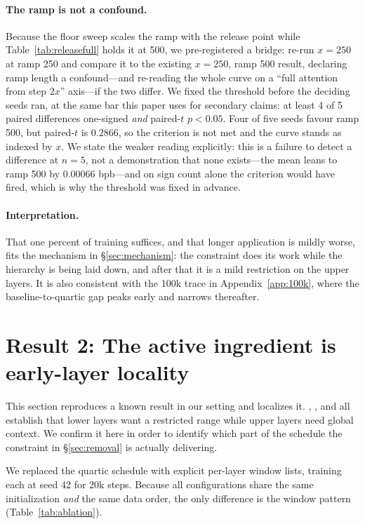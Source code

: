 \documentclass[11pt,a4paper]{article}
\begin{document}
\paragraph{The ramp is not a confound.} Because the floor sweep scales the ramp with the release point while Table~\ref{tab:releasefull} holds it at 500, we pre-registered a bridge: re-run $x=250$ at ramp 250 and compare it to the existing $x=250$, ramp 500 result, declaring ramp length a confound---and re-reading the whole curve on a ``full attention from step $2x$'' axis---if the two differ. We fixed the threshold before the deciding seeds ran, at the same bar this paper uses for secondary claims: at least 4 of 5 paired differences one-signed \emph{and} paired-$t$ $p<0.05$. Four of five seeds favour ramp 500, but paired-$t$ is $0.2866$, so the criterion is not met and the curve stands as indexed by $x$. We state the weaker reading explicitly: this is a failure to detect a difference at $n=5$, not a demonstration that none exists---the mean leans to ramp 500 by $0.00066$ bpb---and on sign count alone the criterion would have fired, which is why the threshold was fixed in advance.

\paragraph{Interpretation.} That one percent of training suffices, and that longer application is mildly worse, fits the mechanism in \S\ref{sec:mechanism}: the constraint does its work while the hierarchy is being laid down, and after that it is a mild restriction on the upper layers. It is also consistent with the 100k trace in Appendix~\ref{app:100k}, where the baseline-to-quartic gap peaks early and narrows thereafter.

\section{Result 2: The active ingredient is early-layer locality}
\label{sec:ablation}

This section reproduces a known result in our setting and localizes it. \citet{sukhbaatar2019adaptive}, \citet{rae2020deep}, and \citet{xu2025mswa} all establish that lower layers want a restricted range while upper layers need global context. We confirm it here in order to identify which part of the schedule the constraint in \S\ref{sec:removal} is actually delivering.

We replaced the quartic schedule with explicit per-layer window lists, training each at seed 42 for 20k steps. Because all configurations share the same initialization \emph{and} the same data order, the only difference is the window pattern (Table~\ref{tab:ablation}).
\end{document}
